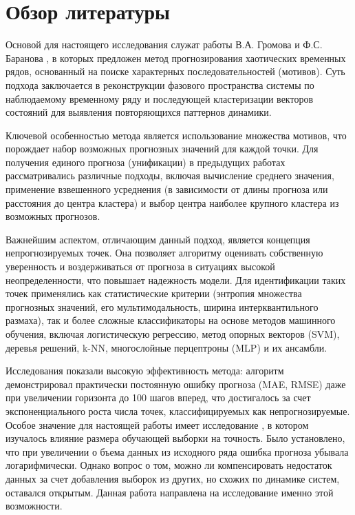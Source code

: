 \documentclass[a4paper,12pt]{extarticle}
\begin{document}
\section{Обзор литературы}

Основой для настоящего исследования служат работы В.А. Громова и Ф.С. Баранова  \cite{GromovBaranov2023}
, в которых предложен метод прогнозирования хаотических временных рядов,
 основанный на поиске характерных последовательностей (мотивов).
  Суть подхода заключается в реконструкции фазового пространства
   системы по наблюдаемому временному ряду и последующей кластеризации
   векторов состояний для выявления повторяющихся паттернов динамики.

Ключевой особенностью метода является использование множества мотивов,
что порождает набор возможных прогнозных значений для каждой точки.
 Для получения единого прогноза (унификации) в предыдущих работах
  рассматривались различные подходы, включая вычисление среднего
   значения, применение взвешенного усреднения (в зависимости от длины прогноза или расстояния
    до центра кластера) и выбор центра наиболее крупного кластера из возможных прогнозов.

Важнейшим аспектом, отличающим данный подход, является концепция
непрогнозируемых точек. Она позволяет алгоритму оценивать собственную уверенность
 и воздерживаться от прогноза в ситуациях высокой неопределенности,
 что повышает надежность модели. Для идентификации таких точек применялись
 как статистические критерии (энтропия множества прогнозных значений, его
 мультимодальность, ширина интерквантильного размаха), так и более сложные
 классификаторы на основе методов машинного обучения, включая логистическую регрессию,
  метод опорных векторов (SVM), деревья решений, k-NN, многослойные перцептроны (MLP) и их ансамбли.\cite{Wang2019}

Исследования показали высокую эффективность метода: алгоритм демонстрировал
практически постоянную ошибку прогноза (MAE, RMSE) даже при увеличении
горизонта до 100 шагов вперед, что достигалось за счет экспоненциального
 роста числа точек, классифицируемых как непрогнозируемые. Особое значение
  для настоящей работы имеет исследование  \cite{Gromov2021}, в котором изучалось влияние
  размера обучающей выборки на точность. Было установлено, что при увеличении о
  бъема данных из исходного ряда ошибка прогноза убывала логарифмически. Однако
  вопрос о том, можно ли компенсировать недостаток данных за счет добавления
  выборок из других, но схожих по динамике систем, оставался открытым.
 Данная работа направлена на исследование именно этой возможности.
\end{document}
